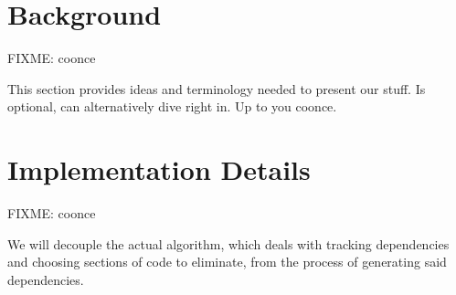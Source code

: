 \documentclass[preprint]{acm_proc_article-sp}
\begin{document}
\section{Background}
FIXME: coonce

This section provides ideas and terminology needed to present our stuff. Is
optional, can alternatively dive right in. Up to you coonce.


\section{Implementation Details}
FIXME: coonce

We will decouple the actual algorithm, which deals with tracking dependencies
and choosing sections of code to eliminate, from the process of generating said
dependencies.
\end{document}
